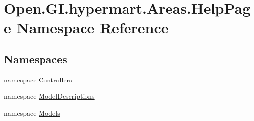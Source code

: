 \hypertarget{namespace_open_1_1_g_i_1_1hypermart_1_1_areas_1_1_help_page}{}\section{Open.\+G\+I.\+hypermart.\+Areas.\+Help\+Page Namespace Reference}
\label{namespace_open_1_1_g_i_1_1hypermart_1_1_areas_1_1_help_page}
\subsection*{Namespaces}
\begin{DoxyCompactItemize}
\item 
namespace \hyperlink{namespace_open_1_1_g_i_1_1hypermart_1_1_areas_1_1_help_page_1_1_controllers}{Controllers}
\item 
namespace \hyperlink{namespace_open_1_1_g_i_1_1hypermart_1_1_areas_1_1_help_page_1_1_model_descriptions}{Model\+Descriptions}
\item 
namespace \hyperlink{namespace_open_1_1_g_i_1_1hypermart_1_1_areas_1_1_help_page_1_1_models}{Models}
\end{DoxyCompactItemize}
